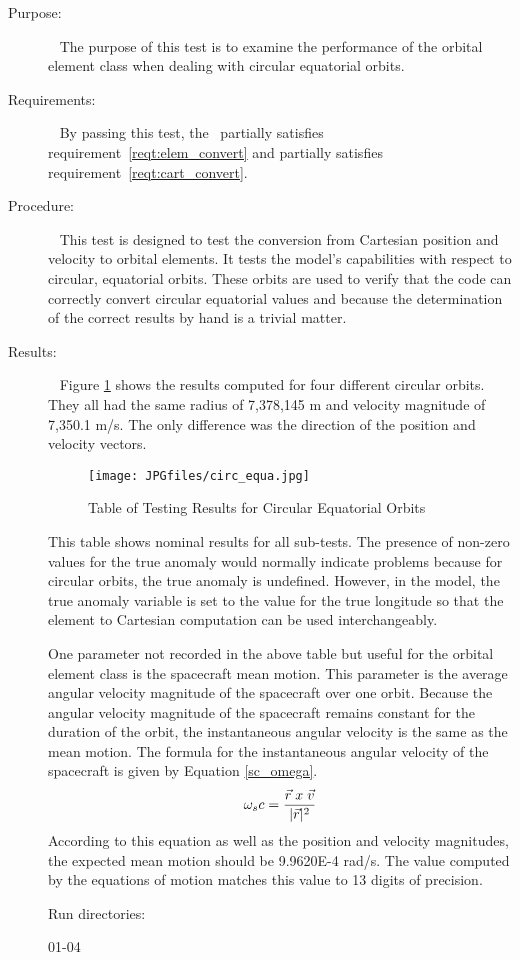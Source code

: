 \label{test:circ_equa_per}
\begin{description}
\item[Purpose:] \ \newline
The purpose of this test is to examine the performance of the orbital element
class when dealing with circular equatorial orbits.
\item[Requirements:] \ \newline
By passing this test, the \OrbitalElement\ partially satisfies
requirement~\ref{reqt:elem_convert} and partially satisfies
requirement~\ref{reqt:cart_convert}.
\item[Procedure:]\ \newline
This test is designed to test the conversion from Cartesian position and
velocity to orbital elements.  It tests the model's capabilities with respect
to circular, equatorial orbits.  These orbits are used to verify that the
code can correctly convert circular equatorial values and because the
determination of the correct results by hand is a trivial matter.
\item[Results:]\ \newline
Figure \ref{cir_eq_tab} shows the results computed for four different circular
orbits.  They all had the same radius of 7,378,145 m and velocity magnitude of
7,350.1 m/s.  The only difference was the direction of the position and velocity
vectors.

\begin{figure}[h]
\begin{center}
\texttt{[image: JPGfiles/circ\_equa.jpg]}
\caption{Table of Testing Results for Circular Equatorial Orbits}
\label{cir_eq_tab}
\end{center}
\end{figure}
This table shows nominal results for all sub-tests.  The presence of non-zero
values for the true anomaly would normally indicate problems because for
circular orbits, the true anomaly is undefined.  However, in the model, the
true anomaly variable is set to the value for the true longitude so that the
element to Cartesian computation can be used interchangeably.

One parameter not recorded in the above table but useful for the orbital
element class is the spacecraft mean motion.  This parameter is the
average angular velocity magnitude of the spacecraft over one orbit.
Because the angular velocity magnitude of the spacecraft remains constant
for the duration of the orbit, the instantaneous angular velocity is the
same as the mean motion.  The formula for the instantaneous angular velocity
of the spacecraft is given by Equation
\ref{sc_omega}.
\begin{equation}
\omega_sc = \frac{\vec{r} \thickspace x \thickspace \vec{v}}{|\vec{r}|^2}
\label{sc_omega}
\end{equation}
According to this equation as well as the position and velocity
magnitudes, the expected mean motion should be 9.9620E-4 rad/s.  The value
computed by the equations of motion matches this value to 13 digits of
precision.

Run directories:

01-04
\end{description}

